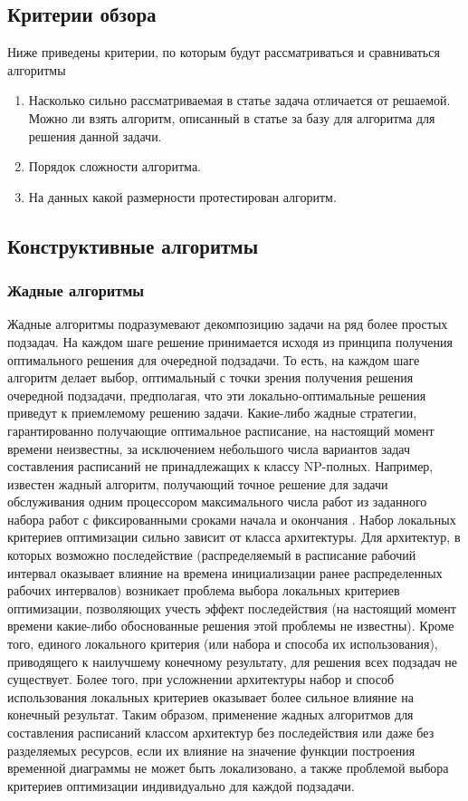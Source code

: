 \subsection{Критерии обзора}
Ниже приведены критерии, по которым будут рассматриваться и сравниваться алгоритмы
\begin{enumerate}
    \item Насколько сильно рассматриваемая в статье задача отличается от решаемой. Можно ли взять алгоритм, описанный в статье за базу для алгоритма для решения данной задачи.
    \item Порядок сложности алгоритма.
    \item На данных какой размерности протестирован алгоритм.
\end{enumerate}
\subsection{Конструктивные алгоритмы}
\subsubsection{Жадные алгоритмы}
Жадные алгоритмы подразумевают декомпозицию задачи на ряд более простых подзадач. На каждом шаге решение принимается исходя из принципа получения оптимального решения для очередной подзадачи. То есть, на каждом шаге алгоритм делает выбор, оптимальный с точки зрения получения решения очередной подзадачи, предполагая, что эти локально-оптимальные решения приведут к приемлемому решению задачи. Какие-либо жадные стратегии, гарантированно получающие оптимальное расписание, на настоящий момент времени неизвестны, за исключением небольшого числа вариантов задач составления расписаний не принадлежащих к классу NP-полных. Например, известен жадный алгоритм, получающий точное решение для задачи обслуживания одним процессором максимального числа работ из заданного набора работ с фиксированными сроками начала и окончания \cite{Cormen}. Набор локальных критериев оптимизации сильно зависит от класса архитектуры. Для архитектур, в которых возможно последействие (распределяемый в расписание рабочий интервал оказывает влияние на времена инициализации ранее распределенных рабочих интервалов) возникает проблема выбора локальных критериев оптимизации, позволяющих учесть эффект последействия (на настоящий момент времени какие-либо обоснованные решения этой проблемы не известны). Кроме того, единого локального критерия (или набора и способа их использования), приводящего к наилучшему конечному результату, для решения всех подзадач не существует. Более того, при усложнении архитектуры набор и способ использования локальных критериев оказывает более сильное влияние на конечный результат. Таким образом, применение жадных алгоритмов для составления расписаний классом архитектур без последействия или даже без разделяемых ресурсов, если их влияние на значение функции построения временной диаграммы не может быть локализовано, а также проблемой выбора критериев оптимизации индивидуально для каждой подзадачи.

